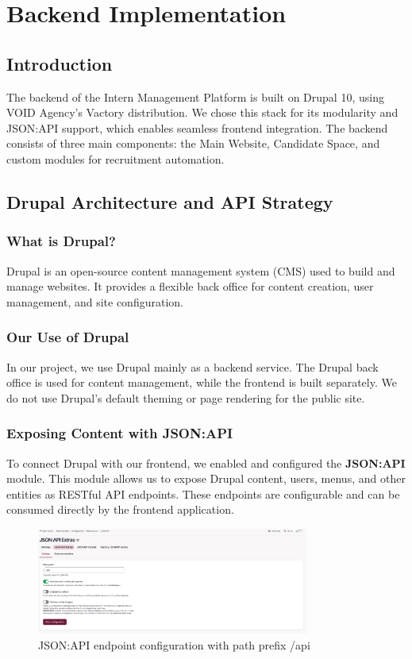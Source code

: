 \section{Backend Implementation}
\subsection{Introduction}
The backend of the Intern Management Platform is built on Drupal 10, using VOID Agency's Vactory distribution. We chose this stack for its modularity and JSON:API support, which enables seamless frontend integration. The backend consists of three main components: the Main Website, Candidate Space, and custom modules for recruitment automation.

\subsection{Drupal Architecture and API Strategy}

\subsubsection{What is Drupal?}
Drupal is an open-source content management system (CMS) used to build and manage websites. It provides a flexible back office for content creation, user management, and site configuration.

\subsubsection{Our Use of Drupal}
In our project, we use Drupal mainly as a backend service. The Drupal back office is used for content management, while the frontend is built separately. We do not use Drupal's default theming or page rendering for the public site.

\subsubsection{Exposing Content with JSON:API}
To connect Drupal with our frontend, we enabled and configured the \textbf{JSON:API} module. This module allows us to expose Drupal content, users, menus, and other entities as RESTful API endpoints. These endpoints are configurable and can be consumed directly by the frontend application.

\begin{figure}[H]
    \centering
    \includegraphics[width=0.8\textwidth]{images/json-api-path-configuration.png}
    \caption{JSON:API endpoint configuration with path prefix /api}
    \label{fig:jsonapi_path_config}
\end{figure}

